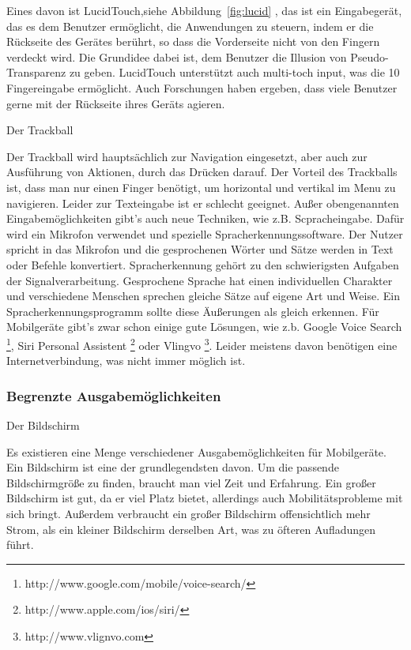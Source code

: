 Eines davon ist LucidTouch,siehe Abbildung~\ref{fig:lucid} \cite{lucidtouch}, das ist ein Eingabegerät, das es dem Benutzer ermöglicht, die Anwendungen zu steuern, indem er die Rückseite des Gerätes berührt, so dass die Vorderseite nicht von den Fingern verdeckt wird. Die Grundidee dabei ist, dem Benutzer die Illusion von Pseudo-Transparenz zu geben. LucidTouch unterstützt auch multi-toch input, was die 10 Fingereingabe ermöglicht. Auch Forschungen haben ergeben, dass viele Benutzer gerne mit der Rückseite ihres Geräts agieren.

Der Trackball

Der Trackball wird hauptsächlich zur Navigation eingesetzt, aber auch zur Ausführung von Aktionen, durch das Drücken darauf. Der Vorteil des Trackballs ist, dass man nur einen Finger benötigt, um horizontal und vertikal im Menu zu navigieren. Leider zur Texteingabe ist er schlecht geeignet.
Außer obengenannten Eingabemöglichkeiten gibt’s auch neue Techniken, wie z.B. Scpracheingabe. Dafür wird ein Mikrofon verwendet und spezielle Spracherkennungssoftware. Der Nutzer spricht in das Mikrofon und die gesprochenen Wörter und Sätze werden in Text oder Befehle konvertiert. Spracherkennung  gehört zu den schwierigsten Aufgaben der Signalverarbeitung. Gesprochene Sprache hat einen individuellen Charakter und verschiedene Menschen sprechen gleiche Sätze auf eigene Art und Weise. Ein Spracherkennungsprogramm sollte diese Äußerungen als gleich erkennen. Für Mobilgeräte gibt’s zwar schon einige gute Lösungen, wie z.b. Google Voice Search 
\footnote{http://www.google.com/mobile/voice-search/}, Siri Personal Assistent \footnote{http://www.apple.com/ios/siri/} oder Vlingvo \footnote{http://www.vlignvo.com}. Leider meistens davon benötigen eine Internetverbindung, was nicht immer möglich ist.




\subsubsection{Begrenzte Ausgabemöglichkeiten} %
\label{ssub:einschr_nkungen_in_bedienung}

Der Bildschirm


Es existieren eine Menge verschiedener Ausgabemöglichkeiten für Mobilgeräte. Ein Bildschirm ist eine der grundlegendsten davon. Um die passende Bildschirmgröße zu finden, braucht man viel Zeit und Erfahrung. Ein großer Bildschirm ist gut, da er viel Platz bietet, allerdings auch Mobilitätsprobleme mit sich bringt. Außerdem verbraucht ein großer Bildschirm offensichtlich mehr Strom, als ein kleiner Bildschirm derselben Art, was zu öfteren Aufladungen führt. 

